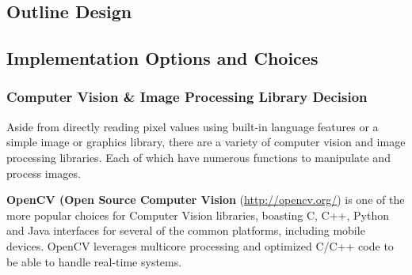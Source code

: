 \documentclass[11pt,fleqn,twoside]{article}
\begin{document}

\subsection{Outline Design}

\subsection{Implementation Options and Choices}

\subsubsection{Computer Vision \& Image Processing Library Decision}

Aside from directly reading pixel values using built-in language features or a simple image or 
graphics library, there are a variety of computer vision and image processing libraries. Each of
which have numerous functions to manipulate and process images.

\textbf{OpenCV (Open Source Computer Vision} (\url{http://opencv.org/}) is one of the more popular 
choices for Computer Vision libraries, boasting C, C++, Python and Java interfaces for several of 
the common platforms, including mobile devices. OpenCV leverages multicore processing and 
optimized C/C++ code to be able to handle real-time systems.
\end{document}
